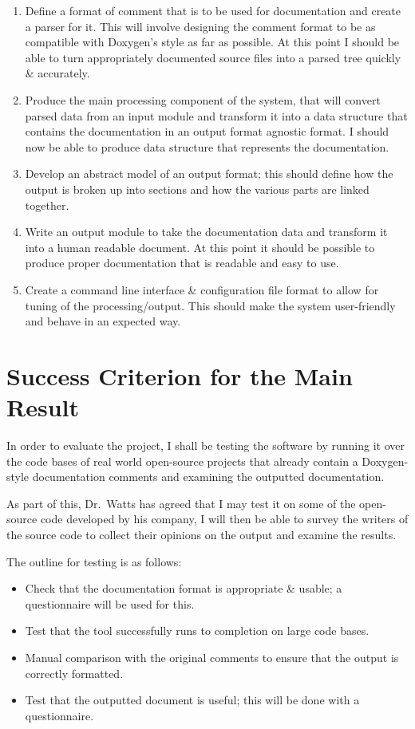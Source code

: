 \begin{enumerate}

\item Define a format of comment that is to be used for documentation
  and create a parser for it. This will involve designing the comment
  format to be as compatible with Doxygen's style as far as possible.
  At this point I should be able to turn appropriately documented
  source files into a parsed tree quickly \& accurately.
\item Produce the main processing component of the system, that will
  convert parsed data from an input module and transform it into a
  data structure that contains the documentation in an output format
  agnostic format. I should now be able to produce data structure that
  represents the documentation.
\item Develop an abstract model of an output format; this should define
  how the output is broken up into sections and how the various parts
  are linked together.
\item Write an output module to take the documentation data and
  transform it into a human readable document. At this point it should
  be possible to produce proper documentation that is readable and easy
  to use.
\item Create a command line interface \& configuration file format to
  allow for tuning of the processing/output. This should make the system
  user-friendly and behave in an expected way.
\end{enumerate}

\section{Success Criterion for the Main Result}

In order to evaluate the project, I shall be testing the software by
running it over the code bases of real world open-source projects that
already contain a Doxygen-style documentation comments and examining
the outputted documentation.

As part of this, Dr.~Watts has agreed that I may test it on some of
the open-source code developed by his company, I will then be able to
survey the writers of the source code to collect their opinions on the
output and examine the results.

The outline for testing is as follows:
\begin{itemize}
    \item Check that the documentation format is appropriate \& usable; a
    questionnaire will be used for this.
    \item Test that the tool successfully runs to completion on large code
    bases.
    \item Manual comparison with the original comments to ensure that the output
    is correctly formatted.
    \item Test that the outputted document is useful; this will be done with a
    questionnaire.
\end{itemize}

